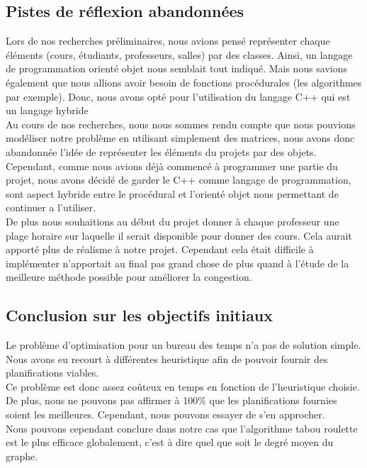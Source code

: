 \documentclass[a4paper,11pt]{article}
\begin{document}
	\subsection{Pistes de réflexion abandonnées}
		Lors de nos recherches préliminaires, nous avions pensé représenter chaque éléments (cours, étudiants, professeurs, salles) par des classes. Ainsi, un langage de programmation orienté objet nous semblait tout indiqué. Mais nous savions également que nous allions avoir besoin de fonctions procédurales (les algorithmes par exemple). Donc, nous avons opté pour l'utilisation du langage C++ qui est un langage hybride\\
		Au cours de nos recherches, nous nous sommes rendu compte que nous pouvions modéliser notre problème en utilisant simplement des matrices, nous avons donc abandonnée l'idée de représenter les éléments du projets par des objets.\\
		Cependant, comme nous avions déjà commencé à programmer une partie du projet, nous avons décidé de garder le C++ comme langage de programmation, sont aspect hybride entre le procédural et l'orienté objet nous permettant de continuer a l'utiliser.\\
		De plus nous souhaitions au début du projet donner à chaque professeur une plage horaire sur laquelle il serait disponible pour donner des cours. Cela aurait apporté plus de réalisme à notre projet. Cependant cela était difficile à implémenter n'apportait au final pas grand chose de plus quand à l'étude de la meilleure méthode possible pour améliorer la congestion.\\

	\subsection{Conclusion sur les objectifs initiaux}
		Le problème d'optimisation pour un bureau des temps n'a pas de solution simple. Nous avons eu recourt à différentes heuristique afin de pouvoir fournir des planifications viables.\\
		Ce problème est donc assez coûteux en temps en fonction de l'heuristique choisie. De plus, nous ne pouvons pas affirmer à 100\% que les planifications fournies soient les meilleures. Cependant, nous pouvons essayer de s'en approcher.\\
		Nous pouvons cependant conclure dans notre cas que l'algorithme tabou roulette est le plus efficace globalement, c'est à dire quel que soit le degré moyen du graphe.\\
\end{document}
